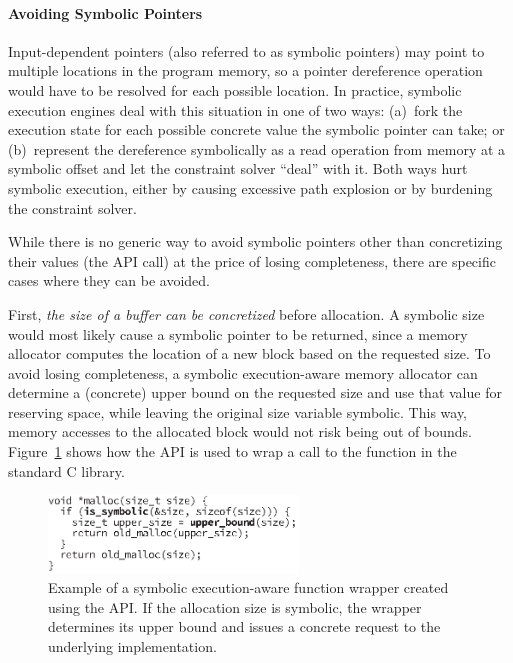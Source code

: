 \paragraph{Avoiding Symbolic Pointers}

Input-dependent pointers (also referred to as symbolic pointers) may point to multiple locations in the program memory, so a pointer dereference operation would have to be resolved for each possible location.  In practice, symbolic execution engines deal with this situation in one of two ways:
%
(a)~fork the execution state for each possible concrete value the symbolic pointer can take; or
%
(b)~represent the dereference symbolically as a read operation from memory at a symbolic offset and let the constraint solver ``deal'' with it.
%
Both ways hurt symbolic execution, either by causing excessive path explosion or by burdening the constraint solver.

While there is no generic way to avoid symbolic pointers other than concretizing their values (the  API call) at the price of losing completeness, there are specific cases where they can be avoided.

First, \emph{the size of a buffer can be concretized} before allocation.  A symbolic size would most likely cause a symbolic pointer to be returned, since a memory allocator computes the location of a new block based on the requested size.  To avoid losing completeness, a symbolic execution-aware memory allocator can determine a (concrete) upper bound on the requested size and use that value for reserving space, while leaving the original size variable symbolic.  This way, memory accesses to the allocated block would not risk being out of bounds.  Figure~\ref{fig:sym-malloc} shows how the \chef API is used to wrap a call to the  function in the standard C library.

\begin{figure}
  \centering
  \includegraphics[width=2.6in]{chef/figures/mallocopt}
  \caption{Example of a symbolic execution-aware  function wrapper created using the \chef API.  If the allocation size is symbolic, the wrapper determines its upper bound and issues a concrete request to the underlying implementation.}
  \label{fig:sym-malloc}
\end{figure}

